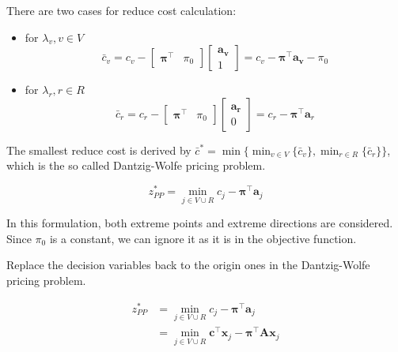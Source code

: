         There are two cases for reduce cost calculation:
        \begin{itemize}
            \item for $\lambda_v, v \in V$
            \begin{equation*}
                \bar{c}_v = c_v - \begin{bmatrix}\mathbf{\pi}^\top & \pi_0\end{bmatrix} \begin{bmatrix}\mathbf{a_v} \\ 1\end{bmatrix} = c_v - \mathbf{\pi}^\top \mathbf{a_v} - \pi_0
            \end{equation*}
            \item for $\lambda_r, r \in R$
            \begin{equation*}
                \bar{c}_r = c_r - \begin{bmatrix}\mathbf{\pi}^\top & \pi_0\end{bmatrix}\begin{bmatrix}\mathbf{a_r} \\ 0\end{bmatrix} = c_r - \mathbf{\pi}^\top \mathbf{a}_r
            \end{equation*}
        \end{itemize}

        The smallest reduce cost is derived by $\bar{c}^* = \min \{\min_{v \in V}\{\bar{c}_v\}, \min_{r \in R} \{\bar{c}_r\}\}$, which is the so called Dantzig-Wolfe pricing problem.

        \begin{equation*}
            z_{PP}^* = \min_{j \in V \cup R} c_j - \mathbf{\pi}^\top \mathbf{a}_j
        \end{equation*}

        In this formulation, both extreme points and extreme directions are considered. Since $\pi_0$ is a constant, we can ignore it as it is in the objective function.

        Replace the decision variables back to the origin ones in the Dantzig-Wolfe pricing problem. 

        \begin{align*}
            z_{PP}^* &= \min_{j \in V \cup R} c_j - \mathbf{\pi}^\top \mathbf{a}_j\\
            & = \min_{j \in V \cup R} \mathbf{c^\top x}_j - \mathbf{\pi^\top A x}_j\\
        \end{align*}

